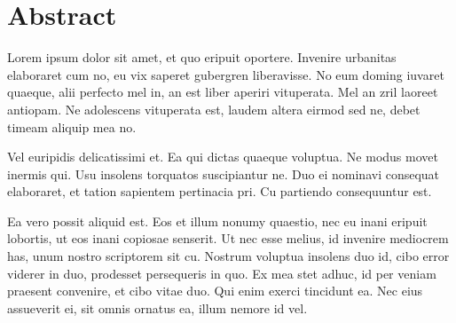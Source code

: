 \chapter*{Abstract}

Lorem ipsum dolor sit amet, et quo eripuit oportere. Invenire urbanitas elaboraret cum no, eu vix saperet gubergren liberavisse. No eum doming iuvaret quaeque, alii perfecto mel in, an est liber aperiri vituperata. Mel an zril laoreet antiopam. Ne adolescens vituperata est, laudem altera eirmod sed ne, debet timeam aliquip mea no.

Vel euripidis delicatissimi et. Ea qui dictas quaeque voluptua. Ne modus movet inermis qui. Usu insolens torquatos suscipiantur ne. Duo ei nominavi consequat elaboraret, et tation sapientem pertinacia pri. Cu partiendo consequuntur est.

Ea vero possit aliquid est. Eos et illum nonumy quaestio, nec eu inani eripuit lobortis, ut eos inani copiosae senserit. Ut nec esse melius, id invenire mediocrem has, unum nostro scriptorem sit cu. Nostrum voluptua insolens duo id, cibo error viderer in duo, prodesset persequeris in quo. Ex mea stet adhuc, id per veniam praesent convenire, et cibo vitae duo. Qui enim exerci tincidunt ea. Nec eius assueverit ei, sit omnis ornatus ea, illum nemore id vel.